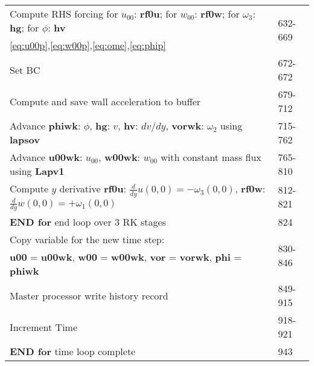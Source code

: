 \documentclass[titlepage,12pt,letter]{article}
\numberwithin{equation}{section}
\begin{document}
\begin{table}[H]
	\centering 
	\renewcommand{\arraystretch}{1.5} 
	\begin{tabular}{l|l}
		\qquad \qquad Compute RHS forcing for $u_{00}$: \textbf{rf0u}; for $w_{00}$: \textbf{rf0w}; for $\omega_3$: \textbf{hg}; for $\phi$: \textbf{hv}&\multirow{2}{*}{632-669}\\ 
		\qquad \qquad \eqref{eq:u00p},\eqref{eq:w00p},\eqref{eq:ome},\eqref{eq:phip}&\\
		\qquad \qquad Set BC&672-672\\
		\qquad \qquad Compute and save wall acceleration to buffer&679-712\\
		\qquad \qquad Advance \textbf{phiwk}: $\phi$, \textbf{hg}: $v$, \textbf{hv}: $dv/dy$, \textbf{vorwk}: $\omega_2$ using \textbf{lapsov}&715-762\\
		\qquad \qquad Advance \textbf{u00wk}: $u_{00}$, \textbf{w00wk}: $w_{00}$ with constant mass flux using \textbf{Lapv1}&765-810\\
		\qquad \qquad Compute $y$ derivative \textbf{rf0u}: ${\tfrac{d}{dy} u(0,0) = - \omega_3(0,0)}$, \textbf{rf0w}: ${\tfrac{d}{dy} w(0,0) = + \omega_1(0,0)}$&812-821\\
		\qquad \textbf{END for} end loop over 3 RK stages&824\\ \hdashline
		
		\qquad Copy variable for the new time step:& \multirow{2}{*}{830-846}\\
		\qquad \textbf{u00} = \textbf{u00wk}, \textbf{w00} = \textbf{w00wk}, \textbf{vor} = \textbf{vorwk}, \textbf{phi} = \textbf{phiwk}&\\
		\qquad Master processor write history record& 849-915\\
		\qquad Increment Time&918-921\\
		\textbf{END for} time loop complete&943\\ \hline
	\end{tabular} 
\end{table}
\end{document}
